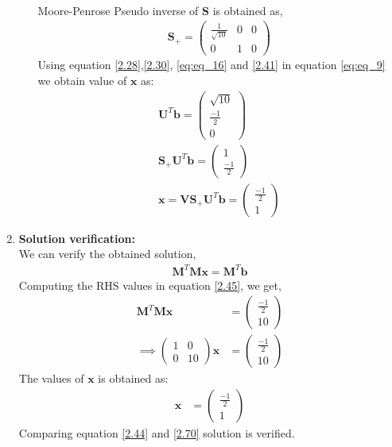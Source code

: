 \documentclass[journal,12pt,twocolumn]{IEEEtran}
\let\vec\mathbf
\numberwithin{equation}{subsection}
\newcommand{\myvec}[1]{\ensuremath{\begin{pmatrix}#1\end{pmatrix}}}
\begin{document}
\begin{enumerate}
\begin{enumerate}
\begin{align}
\end{align}
Moore-Penrose Pseudo inverse of $\vec{S}$ is obtained as,
\begin{align}
\vec{S_+} = \myvec{\frac{1}{\sqrt{10}}&0&0\\0&1&0}  \label{2.41}
\end{align}
Using equation \eqref{2.28},\eqref{2.30}, \eqref{eq:eq_16} and \eqref{2.41} in equation \eqref{eq:eq_9} we obtain value of $\vec{x}$ as:
\begin{align}
\vec{U}^T\vec{b}=\myvec{\sqrt{10} \\ \frac{-1}{2}\\ 0}\\
\vec{S_+}\vec{U}^T\vec{b}=\myvec{1\\ \frac{-1}{2}}\\
\vec{x} = \vec{V}\vec{S_+}\vec{U}^T\vec{b} = \myvec{\frac{-1}{2}\\1} \label{2.44}
\end{align}
\end{enumerate}
\item \textbf{Solution verification:}\\
We can verify the obtained solution,
\begin{align}
\vec{M}^T\vec{M}\vec{x} = \vec{M}^T\vec{b} \label{2.45}
\end{align}
Computing the RHS values in equation \ref{2.45}, we get,
\begin{align}
\vec{M}^T\vec{M}\vec{x} &= \myvec{\frac{-1}{2}\\10}\\
\implies\myvec{1&0\\0&10}\vec{x} &= \myvec{\frac{-1}{2}\\10} \label{eq2.47}
\end{align}
The values of $\vec{x}$ is obtained as:
\begin{align}
\vec{x} &= \myvec{\frac{-1}{2}\\1} \label{2.70}
\end{align}
Comparing equation \eqref{2.44} and \eqref{2.70} solution is verified.

\end{enumerate}
\end{document}
